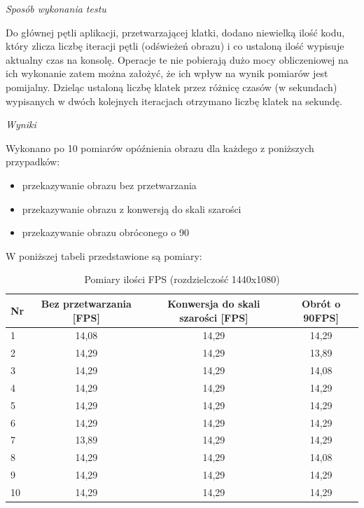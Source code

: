 \documentclass[a4paper,11pt,twoside]{report}
\theoremstyle{definition}
\begin{document}
\begin{description}
\textit{Sposób wykonania testu}

Do głównej pętli aplikacji, przetwarzającej klatki, dodano niewielką ilość kodu, który zlicza liczbę iteracji pętli (odświeżeń obrazu) i co ustaloną ilość wypisuje aktualny czas na konsolę. Operacje te nie pobierają dużo mocy obliczeniowej na ich wykonanie zatem można założyć, że ich wpływ na wynik pomiarów jest pomijalny. Dzieląc ustaloną liczbę klatek przez różnicę czasów (w sekundach) wypisanych w dwóch kolejnych iteracjach otrzymano liczbę klatek na sekundę.

\textit{Wyniki}

Wykonano po 10 pomiarów opóźnienia obrazu dla każdego z poniższych przypadków:
\begin{itemize}
\item przekazywanie obrazu bez przetwarzania
\item przekazywanie obrazu z konwersją do skali szarości
\item przekazywanie obrazu obróconego o 90\textdegree
\end{itemize}

W poniższej tabeli przedstawione są pomiary:
\begin{table}[H]
\centering
\begin{tabular}{lccc}
Nr & Bez przetwarzania {[}FPS{]} & Konwersja do skali szarości {[}FPS{]} & Obrót o 90\textdegree {[}FPS{]} \\ \hline
1  & 14,08                       & 14,29                                 & 14,29                           \\
2  & 14,29                       & 14,29                                 & 13,89                           \\
3  & 14,29                       & 14,29                                 & 14,08                           \\
4  & 14,29                       & 14,29                                 & 14,29                           \\
5  & 14,29                       & 14,29                                 & 14,29                           \\
6  & 14,29                       & 14,29                                 & 14,29                           \\
7  & 13,89                       & 14,29                                 & 14,29                           \\
8  & 14,29                       & 14,29                                 & 14,08                           \\
9  & 14,29                       & 14,29                                 & 14,29                           \\
10 & 14,29                       & 14,29                                 & 14,29                           
\end{tabular}
\caption{Pomiary ilości FPS (rozdzielczość 1440x1080)}
\end{table}


\end{description}
\end{document}
